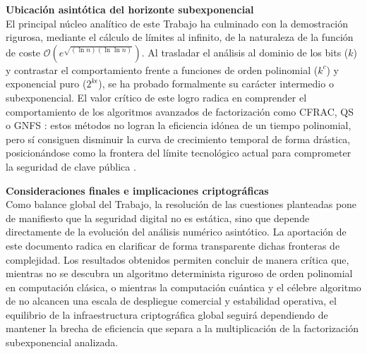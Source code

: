 \documentclass[11pt,a4paper,spanish]{book}
\begin{document}
\noindent \textbf{Ubicación asintótica del horizonte subexponencial} \\
El principal núcleo analítico de este Trabajo ha culminado con la demostración rigurosa, mediante el cálculo de límites al infinito, de la naturaleza de la función de coste $\mathcal{O} \left(e^{\sqrt{(\ln n)(\ln \ln n)}}\right)$. Al trasladar el análisis al dominio de los bits ($k$) y contrastar el comportamiento frente a funciones de orden polinomial ($k^c$) y exponencial puro ($2^{k\epsilon}$), se ha probado formalmente su carácter intermedio o subexponencial. El valor crítico de este logro radica en comprender el comportamiento de los algoritmos avanzados de factorización como CFRAC, QS o GNFS \citep{morrison1975, pomerance1982, lenstra1993}: estos métodos no logran la eficiencia idónea de un tiempo polinomial, pero sí consiguen disminuir la curva de crecimiento temporal de forma drástica, posicionándose como la frontera del límite tecnológico actual para comprometer la seguridad de clave pública \citep{odlyzko1995}.
\vspace{0.3cm}

\noindent \textbf{Consideraciones finales e implicaciones criptográficas} \\
Como balance global del Trabajo, la resolución de las cuestiones planteadas pone de manifiesto que la seguridad digital no es estática, sino que depende directamente de la evolución del análisis numérico asintótico. La aportación de este documento radica en clarificar de forma transparente dichas fronteras de complejidad. Los resultados obtenidos permiten concluir de manera crítica que, mientras no se descubra un algoritmo determinista riguroso de orden polinomial en computación clásica, o mientras la computación cuántica y el célebre algoritmo de \cite{shor1994} no alcancen una escala de despliegue comercial y estabilidad operativa, el equilibrio de la infraestructura criptográfica global seguirá dependiendo de mantener la brecha de eficiencia que separa a la multiplicación de la factorización subexponencial analizada.
\end{document}
